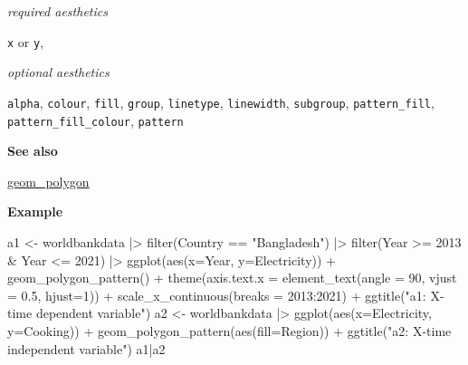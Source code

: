 \documentclass[
  letterpaper,
  DIV=11,
  numbers=noendperiod]{scrreprt}
\newenvironment{Shaded}{\begin{snugshade}}{\end{snugshade}}
\newcommand{\AttributeTok}[1]{\textcolor[rgb]{0.40,0.45,0.13}{#1}}
\newcommand{\DecValTok}[1]{\textcolor[rgb]{0.68,0.00,0.00}{#1}}
\newcommand{\FloatTok}[1]{\textcolor[rgb]{0.68,0.00,0.00}{#1}}
\newcommand{\FunctionTok}[1]{\textcolor[rgb]{0.28,0.35,0.67}{#1}}
\newcommand{\NormalTok}[1]{\textcolor[rgb]{0.00,0.23,0.31}{#1}}
\newcommand{\OtherTok}[1]{\textcolor[rgb]{0.00,0.23,0.31}{#1}}
\newcommand{\SpecialCharTok}[1]{\textcolor[rgb]{0.37,0.37,0.37}{#1}}
\newcommand{\StringTok}[1]{\textcolor[rgb]{0.13,0.47,0.30}{#1}}
\begin{document}
\emph{required aesthetics}

\texttt{x} or \texttt{y},

\emph{optional aesthetics}

\texttt{alpha}, \texttt{colour}, \texttt{fill}, \texttt{group},
\texttt{linetype}, \texttt{linewidth}, \texttt{subgroup},
\texttt{pattern\_fill}, \texttt{pattern\_fill\_colour}, \texttt{pattern}

\textbf{See also}

\hyperref[polygon]{geom\_polygon}

\textbf{Example}

\begin{Shaded}
\begin{Highlighting}[]
\NormalTok{a1 }\OtherTok{\textless{}{-}}\NormalTok{ worldbankdata }\SpecialCharTok{|\textgreater{}}
  \FunctionTok{filter}\NormalTok{(Country }\SpecialCharTok{==} \StringTok{"Bangladesh"}\NormalTok{) }\SpecialCharTok{|\textgreater{}} 
  \FunctionTok{filter}\NormalTok{(Year }\SpecialCharTok{\textgreater{}=} \DecValTok{2013} \SpecialCharTok{\&}\NormalTok{ Year }\SpecialCharTok{\textless{}=} \DecValTok{2021}\NormalTok{) }\SpecialCharTok{|\textgreater{}}
  \FunctionTok{ggplot}\NormalTok{(}\FunctionTok{aes}\NormalTok{(}\AttributeTok{x=}\NormalTok{Year, }\AttributeTok{y=}\NormalTok{Electricity)) }\SpecialCharTok{+} 
  \FunctionTok{geom\_polygon\_pattern}\NormalTok{() }\SpecialCharTok{+}
  \FunctionTok{theme}\NormalTok{(}\AttributeTok{axis.text.x =} \FunctionTok{element\_text}\NormalTok{(}\AttributeTok{angle =} \DecValTok{90}\NormalTok{, }\AttributeTok{vjust =} \FloatTok{0.5}\NormalTok{, }\AttributeTok{hjust=}\DecValTok{1}\NormalTok{)) }\SpecialCharTok{+} 
  \FunctionTok{scale\_x\_continuous}\NormalTok{(}\AttributeTok{breaks =} \DecValTok{2013}\SpecialCharTok{:}\DecValTok{2021}\NormalTok{)  }\SpecialCharTok{+} 
  \FunctionTok{ggtitle}\NormalTok{(}\StringTok{"a1: X{-}time dependent variable"}\NormalTok{)}
\NormalTok{a2 }\OtherTok{\textless{}{-}}\NormalTok{ worldbankdata }\SpecialCharTok{|\textgreater{}}
  \FunctionTok{ggplot}\NormalTok{(}\FunctionTok{aes}\NormalTok{(}\AttributeTok{x=}\NormalTok{Electricity, }\AttributeTok{y=}\NormalTok{Cooking)) }\SpecialCharTok{+} 
  \FunctionTok{geom\_polygon\_pattern}\NormalTok{(}\FunctionTok{aes}\NormalTok{(}\AttributeTok{fill=}\NormalTok{Region)) }\SpecialCharTok{+} 
  \FunctionTok{ggtitle}\NormalTok{(}\StringTok{"a2: X{-}time independent variable"}\NormalTok{)}
\NormalTok{a1}\SpecialCharTok{|}\NormalTok{a2}
\end{Highlighting}
\end{Shaded}
\end{document}
